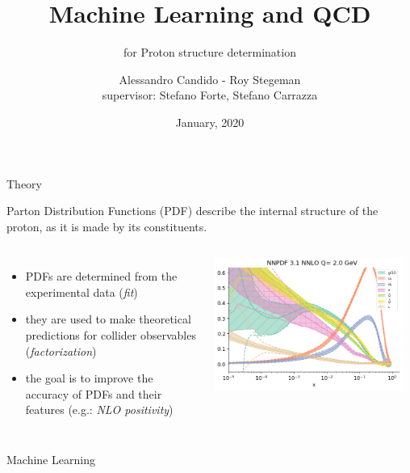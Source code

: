 \documentclass[10pt]{beamer}
\title{Machine Learning and QCD}
\subtitle{for Proton structure determination}
\date{January, 2020}
\author{Alessandro Candido - Roy Stegeman \\
{\footnotesize supervisor:} Stefano Forte, Stefano Carrazza
}
\begin{document}
\maketitle

\begin{frame}{Theory}

Parton Distribution Functions (PDF) describe the internal structure of the proton, as it is made by its constituents.
\vspace*{10pt}

\begin{columns}[T,onlytextwidth]
	\begin{itemize}
		\item PDFs are determined from the experimental data (\textit{fit})
		\item they are used to make theoretical predictions for collider observables (\textit{factorization})
		\item the goal is to improve the accuracy of PDFs and their features (e.g.: \textit{NLO positivity})
	\end{itemize}
	\vspace*{20pt}
	\includegraphics[width=0.95\textwidth]{nnpdf31_}
\end{columns}

\end{frame}

\begin{frame}{Machine Learning}

\end{frame}
\end{document}
